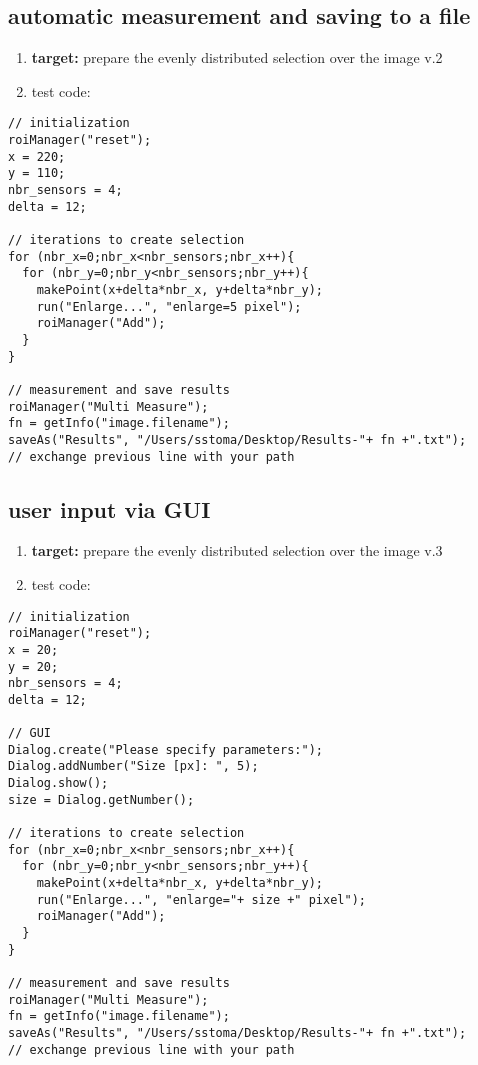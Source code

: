 \documentclass[11pt]{article}
\begin{document}
\subsection{automatic measurement and saving to a file}
\label{sec-7-7}
\begin{enumerate}
\item \textbf{target:} prepare the evenly distributed selection over the image v.2
\item test code:
\end{enumerate}
\begin{verbatim}
// initialization
roiManager("reset");
x = 220;
y = 110;
nbr_sensors = 4;
delta = 12;

// iterations to create selection
for (nbr_x=0;nbr_x<nbr_sensors;nbr_x++){
  for (nbr_y=0;nbr_y<nbr_sensors;nbr_y++){
	makePoint(x+delta*nbr_x, y+delta*nbr_y);
	run("Enlarge...", "enlarge=5 pixel");
	roiManager("Add");
  }
}

// measurement and save results
roiManager("Multi Measure");
fn = getInfo("image.filename");
saveAs("Results", "/Users/sstoma/Desktop/Results-"+ fn +".txt");
// exchange previous line with your path
\end{verbatim}

\subsection{user input via GUI}
\label{sec-7-8}
\begin{enumerate}
\item \textbf{target:} prepare the evenly distributed selection over the image v.3
\item test code:
\end{enumerate}
\begin{verbatim}
// initialization
roiManager("reset");
x = 20;
y = 20;
nbr_sensors = 4;
delta = 12;

// GUI
Dialog.create("Please specify parameters:");
Dialog.addNumber("Size [px]: ", 5);
Dialog.show();
size = Dialog.getNumber();

// iterations to create selection
for (nbr_x=0;nbr_x<nbr_sensors;nbr_x++){
  for (nbr_y=0;nbr_y<nbr_sensors;nbr_y++){
	makePoint(x+delta*nbr_x, y+delta*nbr_y);
	run("Enlarge...", "enlarge="+ size +" pixel");
	roiManager("Add");
  }
}

// measurement and save results
roiManager("Multi Measure");
fn = getInfo("image.filename");
saveAs("Results", "/Users/sstoma/Desktop/Results-"+ fn +".txt");
// exchange previous line with your path
\end{verbatim}
\end{document}
